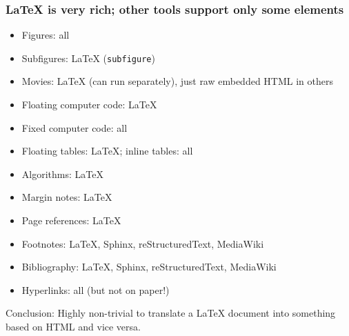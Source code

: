 \documentclass{beamer}
\begin{document}
\begin{frame}
\frametitle{{\LaTeX} is very rich; other tools support only some elements}

\begin{itemize}
\pause
 \item Figures: all
\pause
 \item Subfigures: {\LaTeX} (\texttt{subfigure})
\pause
 \item Movies: {\LaTeX} (can run separately), just raw embedded HTML in others
\pause
 \item Floating computer code: {\LaTeX}
\pause
 \item Fixed computer code: all
\pause
 \item Floating tables: {\LaTeX}; inline tables: all
\pause
 \item Algorithms: {\LaTeX}
\pause
 \item Margin notes: {\LaTeX}
\pause
 \item Page references: {\LaTeX}
\pause
 \item Footnotes: {\LaTeX}, Sphinx, reStructuredText, MediaWiki
\pause
 \item Bibliography: {\LaTeX}, Sphinx, reStructuredText, MediaWiki
\pause
 \item Hyperlinks: all (but not on paper!)
\end{itemize}
\noindent
\pause
Conclusion: Highly non-trivial to translate a {\LaTeX} document into something
based on HTML and vice versa.
\end{frame}
\end{document}
